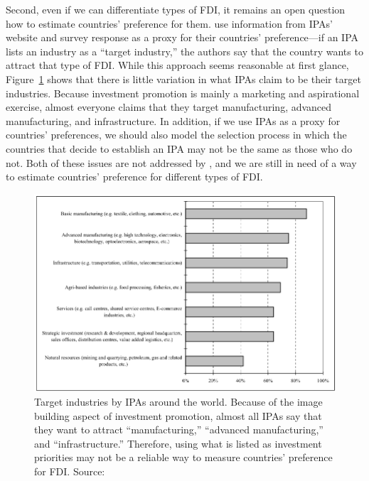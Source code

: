 Second, even if we can differentiate types of FDI, it remains an open question
how to estimate countries' preference for them. \citet{Alfaro2007} use
information from IPAs' website and survey response as a proxy for their
countries' preference---if an IPA lists an industry as a ``target industry,''
the authors say that the country wants to attract that type of FDI. While this
approach seems reasonable at first glance,
Figure~\ref{fig:IPA_target_industries} shows that there is little variation in
what IPAs claim to be their target industries. Because investment promotion is
mainly a marketing and aspirational exercise, almost everyone claims that they
target manufacturing, advanced manufacturing, and infrastructure. In addition,
if we use IPAs as a proxy for countries' preferences, we should also model the
selection process in which the countries that decide to establish an IPA may not
be the same as those who do not. Both of these issues are not addressed by
\citet{Alfaro2007}, and we are still in need of a way to estimate countries'
preference for different types of FDI.

\begin{figure}[tbp] \centering
  \includegraphics[width=\textwidth,keepaspectratio]{../figure/IPA_target_industries}
  \caption[Target industries by IPA around the world.]{Target industries by IPAs
    around the world. Because of the image building aspect of investment
    promotion, almost all IPAs say that they want to attract ``manufacturing,''
    ``advanced manufacturing,'' and ``infrastructure.'' Therefore, using what is
    listed as investment priorities may not be a reliable way to measure
    countries' preference for FDI. Source: \citet{UNCTAD2001}}
  \label{fig:IPA_target_industries}
\end{figure}

